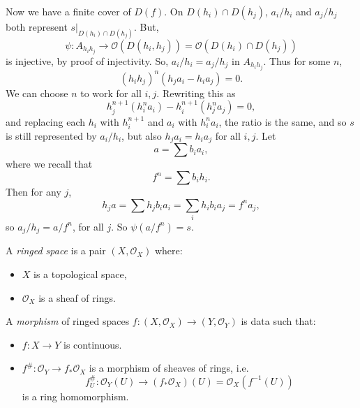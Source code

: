 \documentclass[12pt]{article}
\begin{document}
\begin{proofbox}
	Now we have a finite cover of $D(f)$. On $D(h_i) \cap D(h_j)$, $a_i/h_i$ and $a_j/h_j$ both represent $s|_{D(h_i) \cap D(h_j)}$. But,
	\[
	\psi : A_{h_i h_j} \to \mathcal{O}(D(h_i, h_j)) = \mathcal{O}(D(h_i) \cap D(h_j))
	\]
	is injective, by proof of injectivity. So, $a_i/h_i = a_j/h_j$ in $A_{h_i h_j}$. Thus for some $n$,
	\[
		(h_i h_j)^n (h_j a_i - h_i a_j) = 0.
	\]
	We can choose $n$ to work for all $i, j$. Rewriting this as
	\[
	h_j^{n+1}(h_i^n a_i) - h_i^{n+1}(h_j^n a_j) = 0,
	\]
	and replacing each $h_i$ with $h_i^{n+1}$ and $a_i$ with $h_i^n a_i$, the ratio is the same, and so $s$ is still represented by $a_i/h_i$, but also $h_j a_i = h_i a_j$ for all $i, j$. Let
	\[
	a = \sum b_i a_i,
	\]
	where we recall that
	\[
	f^n = \sum b_i h_i.
	\]
	Then for any $j$,
	\[
	h_j a = \sum h_j b_i a_i = \sum_i h_i b_i a_j = f^n a_j,
	\]
	so $a_j/h_j = a/f^n$, for all $j$. So $\psi(a/f^n) = s$.
\end{proofbox}


\begin{definition}
	A \emph{ringed space} is a pair $(X, \mathcal{O}_X)$ where:
	\begin{itemize}
		\item $X$ is a topological space,
		\item $\mathcal{O}_X$ is a sheaf of rings.
	\end{itemize}

	A \emph{morphism} of ringed spaces $f : (X, \mathcal{O}_X) \to (Y, \mathcal{O}_Y)$ is data such that:
	\begin{itemize}
		\item $f : X \to Y$ is continuous.
		\item $f^{\#} : \mathcal{O}_Y \to f_\ast \mathcal{O}_X$ is a morphism of sheaves of rings, i.e.
			\[
			f_U^{\#} : \mathcal{O}_Y(U) \to (f_\ast \mathcal{O}_X)(U) = \mathcal{O}_X(f^{-1}(U))
			\]
			is a ring homomorphism.
	\end{itemize}
\end{definition}
\end{document}
